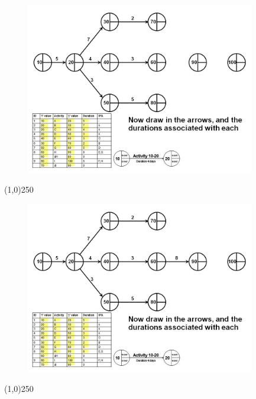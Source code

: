 \begin{frame}
\begin{figure}
	\centering
		\includegraphics[width = 10.0cm]{oldnotes/Slide97.jpg}
\end{figure}
\end{frame}
\begin{center}\line(1,0){250}\end{center}


\begin{frame}
\begin{figure}
	\centering
		\includegraphics[width = 10.0cm]{oldnotes/Slide98.jpg}
\end{figure}
\end{frame}
\begin{center}\line(1,0){250}\end{center}


